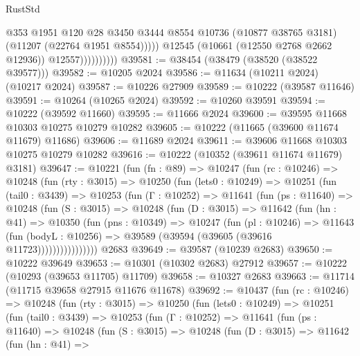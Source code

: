 \begin{lexlean}{RustStd}
\begin{coremodule}
                              @353
                              @1951
                              @120
                              @28
                              @3450
                              @3444
                              @8554
                              @10736
                              (@10877 @38765 @3181)
                              (@11207 (@22764 @1951 @8554)))))
                        @12545
                        (@10661 (@12550 @2768 @2662 @12936))
                        @12557))))))))))
@39581 := @38454 (@38479 (@38520 (@38522 @39577)))
@39582 := @10205 @2024
@39586 := @11634 (@10211 @2024) (@10217 @2024)
@39587 := @10226 @27909
@39589 := @10222 (@39587 @11646)
@39591 := @10264 (@10265 @2024)
@39592 := @10260 @39591
@39594 := @10222 (@39592 @11660)
@39595 := @11666 @2024
@39600 := @39595 @11668 @10303 @10275 @10279 @10282
@39605 := @10222 (@11665 (@39600 @11674 @11679) @11686)
@39606 := @11689 @2024
@39611 := @39606 @11668 @10303 @10275 @10279 @10282
@39616 := @10222 (@10352 (@39611 @11674 @11679) @3181)
@39647 := @10221
    (fun (fn : @89) =>
    @10247
      (fun (rc : @10246) =>
      @10248
        (fun (rty : @3015) =>
        @10250
          (fun (lets0 : @10249) =>
          @10251
            (fun (tail0 : @3439) =>
            @10253
              (fun (Γ : @10252) =>
              @11641
                (fun (ps : @11640) =>
                @10248
                  (fun (S : @3015) =>
                  @10248
                    (fun (D : @3015) =>
                    @11642
                      (fun (hn : @41) =>
                      @10350
                        (fun (pns : @10349) =>
                        @10247
                          (fun (pl : @10246) =>
                          @11643
                            (fun (bodyL : @10256) =>
                            @39589 (@39594 (@39605 (@39616 @11723))))))))))))))))
    @2683
@39649 := @39587 (@10239 @2683)
@39650 := @10222 @39649
@39653 := @10301 (@10302 @2683) @27912
@39657 := @10222 (@10293 (@39653 @11705) @11709)
@39658 := @10327 @2683
@39663 := @11714 (@11715 @39658 @27915 @11676 @11678)
@39692 := @10437
    (fun (rc : @10246) =>
    @10248
      (fun (rty : @3015) =>
      @10250
        (fun (lets0 : @10249) =>
        @10251
          (fun (tail0 : @3439) =>
          @10253
            (fun (Γ : @10252) =>
            @11641
              (fun (ps : @11640) =>
              @10248
                (fun (S : @3015) =>
                @10248
                  (fun (D : @3015) =>
                  @11642
                    (fun (hn : @41) =>

\end{coremodule}
\end{lexlean}
